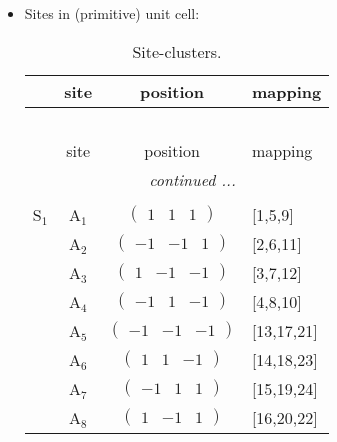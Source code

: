 \documentclass[fleqn,10pt,landscape]{article}
\begin{document}
\begin{itemize}
\item Sites in (primitive) unit cell:
\begin{center}
\renewcommand{\arraystretch}{1.3}
\begin{longtable}{cc|c|l}
\caption{Site-clusters.}
 \\
 \hline \hline
 & site & position & mapping \\ \hline \endfirsthead

\multicolumn{3}{l}{\tablename\ \thetable{}} \\
 \hline \hline
 & site & position & mapping \\ \hline \endhead

 \hline \hline
\multicolumn{3}{r}{\footnotesize\it continued ...} \\ \endfoot

 \hline \hline
\multicolumn{3}{r}{} \\ \endlastfoot

S$_{1}$ & A$_1$ & $\begin{pmatrix} 1 & 1 & 1 \end{pmatrix}$ & [1,5,9] \\
& A$_2$ & $\begin{pmatrix} -1 & -1 & 1 \end{pmatrix}$ & [2,6,11] \\
& A$_3$ & $\begin{pmatrix} 1 & -1 & -1 \end{pmatrix}$ & [3,7,12] \\
& A$_4$ & $\begin{pmatrix} -1 & 1 & -1 \end{pmatrix}$ & [4,8,10] \\
& A$_5$ & $\begin{pmatrix} -1 & -1 & -1 \end{pmatrix}$ & [13,17,21] \\
& A$_6$ & $\begin{pmatrix} 1 & 1 & -1 \end{pmatrix}$ & [14,18,23] \\
& A$_7$ & $\begin{pmatrix} -1 & 1 & 1 \end{pmatrix}$ & [15,19,24] \\
& A$_8$ & $\begin{pmatrix} 1 & -1 & 1 \end{pmatrix}$ & [16,20,22] \\
\end{longtable}
\end{center}


\end{itemize}
\end{document}
